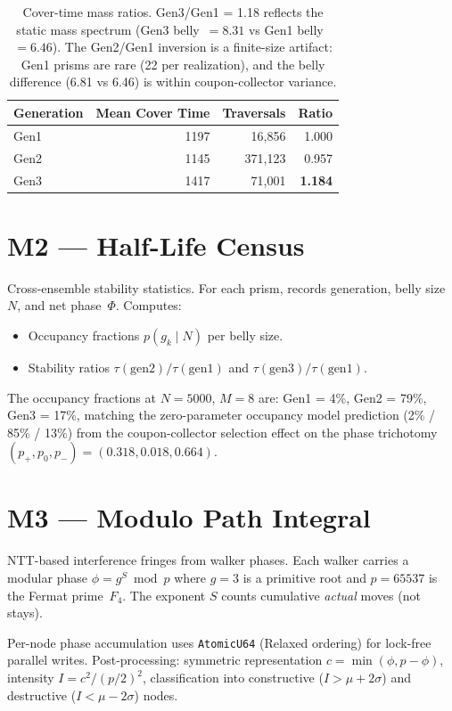 \documentclass[11pt, a4paper, openany]{book}
\newcommand{\code}[1]{\texttt{#1}}
\begin{document}
\begin{table}[H]
\centering
\begin{tabular}{@{} l r r r @{}}
\toprule
\textbf{Generation} & \textbf{Mean Cover Time} & \textbf{Traversals} & \textbf{Ratio} \\
\midrule
Gen1 & 1197 & 16{,}856  & 1.000 \\
Gen2 & 1145 & 371{,}123 & 0.957 \\
Gen3 & 1417 & 71{,}001  & \textbf{1.184} \\
\bottomrule
\end{tabular}
\caption{Cover-time mass ratios.  Gen3/Gen1 = 1.18 reflects the static mass
spectrum (Gen3 belly~$= 8.31$ vs Gen1 belly~$= 6.46$).  The Gen2/Gen1 inversion
is a finite-size artifact: Gen1 prisms are rare (22 per realization), and the
belly difference (6.81 vs 6.46) is within coupon-collector variance.}
\end{table}

\section{M2 --- Half-Life Census}

Cross-ensemble stability statistics.  For each prism, records generation, belly
size~$N$, and net phase~$\Phi$.  Computes:
\begin{itemize}
  \item Occupancy fractions $p(g_k \mid N)$ per belly size.
  \item Stability ratios $\tau(\text{gen2})/\tau(\text{gen1})$ and
        $\tau(\text{gen3})/\tau(\text{gen1})$.
\end{itemize}

The occupancy fractions at $N=5000$, $M=8$ are: Gen1 = 4\%, Gen2 = 79\%,
Gen3 = 17\%, matching the zero-parameter occupancy model prediction
(2\% / 85\% / 13\%) from the coupon-collector selection effect on the phase
trichotomy $(p_+, p_0, p_-) = (0.318, 0.018, 0.664)$.

\section{M3 --- Modulo Path Integral}

NTT-based interference fringes from walker phases.  Each walker carries a
modular phase $\phi = g^S \bmod p$ where $g = 3$ is a primitive root and
$p = 65537$ is the Fermat prime~$F_4$.  The exponent $S$ counts cumulative
\emph{actual} moves (not stays).

Per-node phase accumulation uses \code{AtomicU64} (Relaxed ordering) for
lock-free parallel writes.  Post-processing: symmetric representation
$c = \min(\phi, p - \phi)$, intensity $I = c^2 / (p/2)^2$, classification into
constructive ($I > \mu + 2\sigma$) and destructive ($I < \mu - 2\sigma$) nodes.
\end{document}
